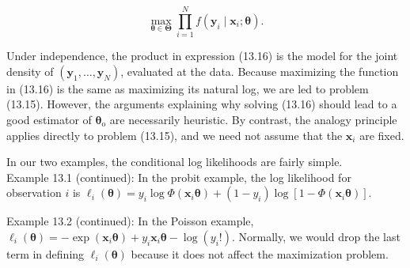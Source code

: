 \documentclass[10pt]{article}
\begin{document}
\begin{equation*}
\max _{\boldsymbol{\theta} \in \boldsymbol{\Theta}} \prod_{i=1}^{N} f\left(\mathbf{y}_{i} \mid \mathbf{x}_{i} ; \boldsymbol{\theta}\right) . \tag{13.16}
\end{equation*}


Under independence, the product in expression (13.16) is the model for the joint density of $\left(\mathbf{y}_{1}, \ldots, \mathbf{y}_{N}\right)$, evaluated at the data. Because maximizing the function in (13.16) is the same as maximizing its natural log, we are led to problem (13.15). However, the arguments explaining why solving (13.16) should lead to a good estimator of $\boldsymbol{\theta}_{\mathrm{o}}$ are necessarily heuristic. By contrast, the analogy principle applies directly to problem (13.15), and we need not assume that the $\mathbf{x}_{i}$ are fixed.

In our two examples, the conditional log likelihoods are fairly simple.\\
Example 13.1 (continued): In the probit example, the log likelihood for observation $i$ is $\ell_{i}(\boldsymbol{\theta})=y_{i} \log \Phi\left(\mathbf{x}_{i} \boldsymbol{\theta}\right)+\left(1-y_{i}\right) \log \left[1-\Phi\left(\mathbf{x}_{i} \boldsymbol{\theta}\right)\right]$.

Example 13.2 (continued): In the Poisson example, $\ell_{i}(\boldsymbol{\theta})=-\exp \left(\mathbf{x}_{i} \boldsymbol{\theta}\right)+y_{i} \mathbf{x}_{i} \boldsymbol{\theta}- \log \left(y_{i}!\right)$. Normally, we would drop the last term in defining $\ell_{i}(\boldsymbol{\theta})$ because it does not affect the maximization problem.
\end{document}
